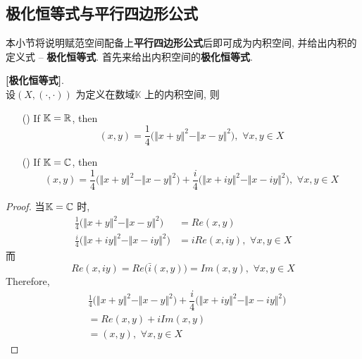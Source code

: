 \newpage

\subsection{极化恒等式与平行四边形公式}
	本小节将说明赋范空间配备上\textbf{平行四边形公式}后即可成为内积空间, 并给出内积的定义式 -- \textbf{极化恒等式}. 首先来给出内积空间的\textbf{极化恒等式}. 
	
	\vspace{1em}
	
	\begin{proposition}\label{prop 3.2.2}
		\textbf{[极化恒等式]}. \\
		设$(X , (\cdot , \cdot))$ 为定义在数域$\mathbb{K}$ 上的内积空间, 则 
		\begin{enumerate}
			\item[(\rmnum{1})] If $\mathbb{K} = \mathbb{R}$, then 
			\[ (x , y) = \dfrac{1}{4} \Big( \Vert x + y \Vert^2 - \Vert x - y \Vert^2 \Big) , \,\, \forall x , y \in X \]
			
			\item[(\rmnum{2})] If $\mathbb{K} = \mathbb{C}$, then
			\[ (x , y) = \dfrac{1}{4} \Big( \Vert x + y \Vert^2 - \Vert x - y \Vert^2 \Big) + \dfrac{i}{4} \Big( \Vert x + iy \Vert^2 - \Vert x - iy \Vert^2 \Big) , \,\, \forall x , y \in X \]
		\end{enumerate}
		
		\vspace{6em}
		
		\begin{proof}
			当$\mathbb{K} = \mathbb{C}$ 时, 
			\begin{align}
				\frac{1}{4} \Big( \Vert x + y \Vert^2 - \Vert x - y \Vert^2 \Big) 
				&= Re(x , y) \\
				\frac{i}{4} \Big( \Vert x + iy \Vert^2 - \Vert x - iy \Vert^2 \Big) 
				&= i Re(x , iy) , \,\, \forall x , y \in X
			\end{align}
			而
			\[ Re(x , iy) = Re \Big( \bar{i} (x , y) \Big) = Im(x , y) , \,\, \forall x , y \in X \]
			Therefore, 
			\begin{align}
				&\frac{1}{4} \Big( \Vert x + y \Vert^2 - \Vert x - y \Vert^2 \Big) + \dfrac{i}{4} \Big( \Vert x + iy \Vert^2 - \Vert x - iy \Vert^2 \Big) \\
				&= Re(x , y) + i Im(x , y) \\
				&= (x , y) , \,\, \forall x , y \in X
			\end{align}
		\end{proof}
	\end{proposition}

